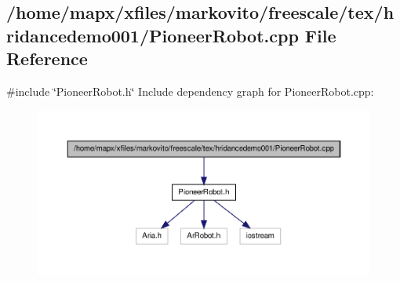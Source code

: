 \subsection{/home/mapx/xfiles/markovito/freescale/tex/hridancedemo001/\-Pioneer\-Robot.cpp \-File \-Reference}
\label{_pioneer_robot_8cpp}
{\ttfamily \#include \char`\"{}\-Pioneer\-Robot.\-h\char`\"{}}\*
\-Include dependency graph for \-Pioneer\-Robot.\-cpp\-:\nopagebreak
\begin{figure}[H]
\begin{center}
\leavevmode
\includegraphics[width=350pt]{_pioneer_robot_8cpp__incl}
\end{center}
\end{figure}
